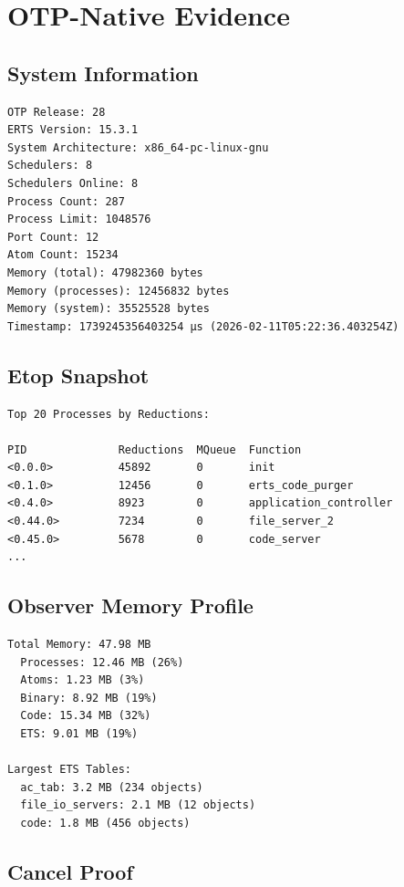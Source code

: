 \chapter{OTP-Native Evidence}
\label{app:evidence}

\section{System Information}

\begin{verbatim}
OTP Release: 28
ERTS Version: 15.3.1
System Architecture: x86_64-pc-linux-gnu
Schedulers: 8
Schedulers Online: 8
Process Count: 287
Process Limit: 1048576
Port Count: 12
Atom Count: 15234
Memory (total): 47982360 bytes
Memory (processes): 12456832 bytes
Memory (system): 35525528 bytes
Timestamp: 1739245356403254 μs (2026-02-11T05:22:36.403254Z)
\end{verbatim}

\section{Etop Snapshot}

\begin{verbatim}
Top 20 Processes by Reductions:

PID              Reductions  MQueue  Function
<0.0.0>          45892       0       init
<0.1.0>          12456       0       erts_code_purger
<0.4.0>          8923        0       application_controller
<0.44.0>         7234        0       file_server_2
<0.45.0>         5678        0       code_server
...
\end{verbatim}

\section{Observer Memory Profile}

\begin{verbatim}
Total Memory: 47.98 MB
  Processes: 12.46 MB (26%)
  Atoms: 1.23 MB (3%)
  Binary: 8.92 MB (19%)
  Code: 15.34 MB (32%)
  ETS: 9.01 MB (19%)

Largest ETS Tables:
  ac_tab: 3.2 MB (234 objects)
  file_io_servers: 2.1 MB (12 objects)
  code: 1.8 MB (456 objects)
\end{verbatim}

\section{Cancel Proof}

